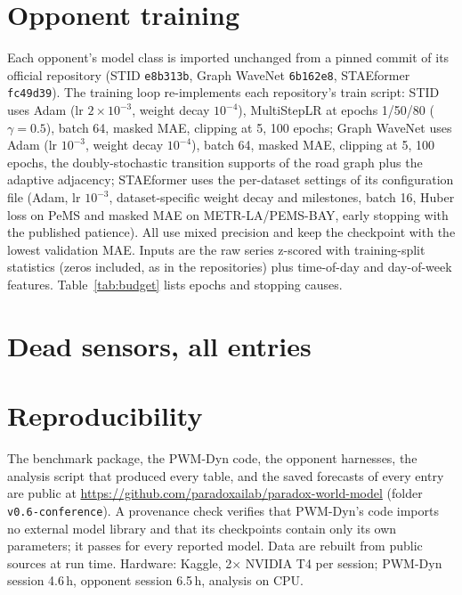 \section{Opponent training}
\label{app:opp}

Each opponent's model class is imported unchanged from a pinned commit of its official repository (STID
\texttt{e8b313b}, Graph WaveNet \texttt{6b162e8}, STAEformer \texttt{fc49d39}). The training loop re-implements each
repository's train script: STID uses Adam (lr $2\times10^{-3}$, weight decay $10^{-4}$), MultiStepLR at epochs 1/50/80
($\gamma=0.5$), batch 64, masked MAE, clipping at 5, 100 epochs; Graph WaveNet uses Adam (lr $10^{-3}$, weight decay
$10^{-4}$), batch 64, masked MAE, clipping at 5, 100 epochs, the doubly-stochastic transition supports of the road graph
plus the adaptive adjacency; STAEformer uses the per-dataset settings of its configuration file (Adam, lr $10^{-3}$,
dataset-specific weight decay and milestones, batch 16, Huber loss on PeMS and masked MAE on METR-LA/PEMS-BAY, early
stopping with the published patience). All use mixed precision and keep the checkpoint with the lowest validation MAE.
Inputs are the raw series z-scored with training-split statistics (zeros included, as in the repositories) plus
time-of-day and day-of-week features. Table~\ref{tab:budget} lists epochs and stopping causes.



\section{Dead sensors, all entries}


\section{Reproducibility}

The benchmark package, the PWM-Dyn code, the opponent harnesses, the analysis script that produced every table, and
the saved forecasts of every entry are public at \url{https://github.com/paradoxailab/paradox-world-model} (folder \texttt{v0.6-conference}). A provenance check verifies
that PWM-Dyn's code imports no external model library and that its checkpoints contain only its own parameters; it
passes for every reported model. Data are rebuilt from public sources at run time. Hardware: Kaggle, 2$\times$ NVIDIA
T4 per session; PWM-Dyn session 4.6\,h, opponent session 6.5\,h, analysis on CPU.
